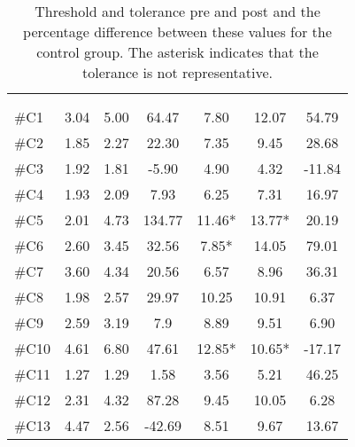 \begin{longtable} {l|c|c|c|c|c|c}
	\caption{Threshold and tolerance pre and post and the percentage difference between these values for the control group. The asterisk indicates that the tolerance is not representative.}
	\label{tab:Control} \\
\cellcolor[HTML]{C0C0C0} {} & 
\multicolumn{3}{c|}{ \cellcolor[HTML]{C0C0C0}{\textbf{Threshold}}} & \multicolumn{3}{c}{ \cellcolor[HTML]{C0C0C0}{\textbf{Tolerance}}}  	\\  \rule{0pt}{3ex} 
  \cellcolor[HTML]{C0C0C0}{} &
 \multicolumn{1}{c|}{ \cellcolor[HTML]{C0C0C0}{Pre [KgF]}} & \multicolumn{1}{c|}{ \cellcolor[HTML]{C0C0C0}{Post [KgF]}} 
 & \multicolumn{1}{c}{ \cellcolor[HTML]{C0C0C0}{\textcolor[HTML]{C0C0C0}{0}Diff [\%]\textcolor[HTML]{C0C0C0}{0}}}
 & \multicolumn{1}{|c|}{ \cellcolor[HTML]{C0C0C0}{Pre [KgF]}} 
 & \multicolumn{1}{c|}{ \cellcolor[HTML]{C0C0C0}{Post [KgF]}} 
 & \multicolumn{1}{c}{ \cellcolor[HTML]{C0C0C0}{\textcolor[HTML]{C0C0C0}{0}Diff [\%]\textcolor[HTML]{C0C0C0}{0}}}  	\\ \hline   
\#C1 & 3.04	& 5.00	&	64.47	& 7.80	& 	12.07 &	54.79\\ \hline
\#C2 & 1.85 	& 2.27	&	22.30	& 7.35	& 	9.45 & 28.68	\\ \hline
\#C3 & 1.92 	& 1.81	&	-5.90	& 4.90	& 	4.32 & -11.84	\\ \hline
\#C4 & 1.93 	& 2.09	&	7.93		& 6.25	&	7.31 & 16.97	\\ \hline
\#C5 & 2.01 	& 4.73 	& 	134.77	& 11.46* 	& 13.77* & 20.19		\\ \hline
\#C6 & 2.60 	& 3.45	& 	32.56		& 7.85*	& 14.05 & 79.01		\\ \hline	
\#C7 & 3.60 & 4.34	& 	20.56		& 6.57 & 8.96  &	36.31 \\ \hline
\#C8 & 1.98 & 2.57	& 	29.97		& 10.25	& 10.91 &	6.37	\\ \hline
\#C9 & 2.59 & 3.19 	& 	7.9		& 8.89	& 9.51 & 6.90		\\ \hline
\#C10 & 4.61 & 6.80	& 	47.61		& 12.85*	& 10.65* & -17.17 \\ \hline
\#C11 & 1.27 & 1.29 	& 	1.58		& 3.56	& 5.21 &  46.25\\ \hline
\#C12 & 2.31 & 4.32 	& 	87.28	& 9.45 & 10.05 & 6.28 \\ \hline
\#C13 & 4.47 & 2.56 	& 	-42.69	& 8.51 & 9.67 & 13.67 \\ \hline

\end{longtable}

